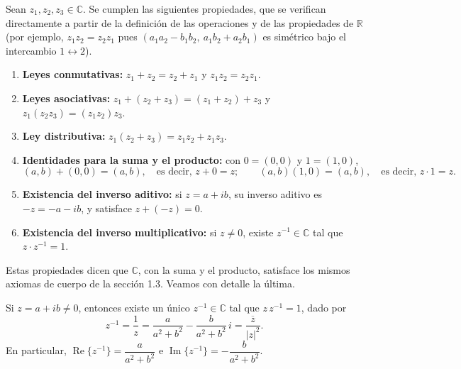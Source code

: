 \documentclass[12pt,a4paper]{book}
\DeclareMathOperator{\Real}{Re}
\DeclareMathOperator{\Imag}{Im}
\begin{document}
  Sean $z_1,z_2,z_3\in\mathbb{C}$. Se cumplen las siguientes propiedades, que se verifican directamente a partir de la definición de las operaciones y de las propiedades de $\mathbb{R}$ (por ejemplo, $z_1z_2=z_2z_1$ pues $(a_1a_2-b_1b_2,\ a_1b_2+a_2b_1)$ es simétrico bajo el intercambio $1\leftrightarrow 2$).
  \begin{enumerate}[label=\roman*)]
    \item \textbf{Leyes conmutativas:} $z_1+z_2=z_2+z_1$ y $z_1z_2=z_2z_1$.
    \item \textbf{Leyes asociativas:} $z_1+(z_2+z_3)=(z_1+z_2)+z_3$ y $z_1(z_2z_3)=(z_1z_2)z_3$.
    \item \textbf{Ley distributiva:} $z_1(z_2+z_3)=z_1z_2+z_1z_3$.
    \item \textbf{Identidades para la suma y el producto:} con $0=(0,0)$ y $1=(1,0)$,
          \begin{equation*}
            (a,b)+(0,0)=(a,b), \quad\text{es decir, } z+0=z; \qquad (a,b)(1,0)=(a,b), \quad\text{es decir, } z\cdot 1=z.
          \end{equation*}
    \item \textbf{Existencia del inverso aditivo:} si $z=a+ib$, su inverso aditivo es $-z=-a-ib$, y satisface $z+(-z)=0$.
    \item \textbf{Existencia del inverso multiplicativo:} si $z\neq 0$, existe $z^{-1}\in\mathbb{C}$ tal que $z\cdot z^{-1}=1$.
  \end{enumerate}

  Estas propiedades dicen que $\mathbb{C}$, con la suma y el producto, satisface los mismos axiomas de cuerpo de la sección 1.3. Veamos con detalle la última.

  \begin{proposicion}
    Si $z=a+ib\neq 0$, entonces existe un único $z^{-1}\in\mathbb{C}$ tal que $z\,z^{-1}=1$, dado por
    \begin{equation*}
      z^{-1}=\frac{1}{z}=\frac{a}{a^2+b^2}-\frac{b}{a^2+b^2}\,i=\frac{\overline{z}}{|z|^2}.
    \end{equation*}
    En particular, $\Real\{z^{-1}\}=\dfrac{a}{a^2+b^2}$ e $\Imag\{z^{-1}\}=-\dfrac{b}{a^2+b^2}$.
  \end{proposicion}
\end{document}
